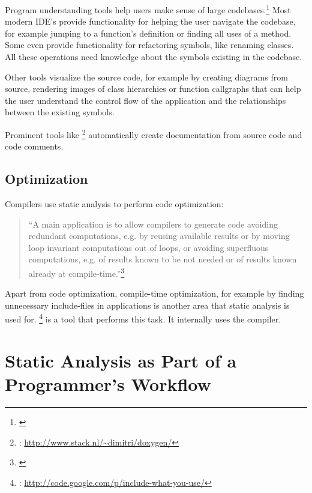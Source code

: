Program understanding tools help users make sense of large codebases.\footnote{\citep[27]{SecureProgramming}} Most modern IDE's provide functionality for helping the user navigate the codebase, for example jumping to a function's definition or finding all uses of a method. Some even provide functionality for refactoring symbols, like renaming classes. All these operations need knowledge about the symbols existing in the codebase.

Other tools visualize the source code, for example by creating  diagrams from source, rendering images of class hierarchies or function callgraphs that can help the user understand the control flow of the application and the relationships between the existing symbols.

Prominent tools like \footnote{: \url{http://www.stack.nl/~dimitri/doxygen/}} automatically create documentation from source code and code comments.

\subsection{Optimization}

Compilers use static analysis to perform code optimization:

\begin{quotation}
``A main application is to allow compilers to generate code avoiding redundant computations, e.g. by reusing available results or by moving loop invariant computations out of loops, or avoiding superfluous computations, e.g. of results known to be not needed or of results known already at compile-time.''\footnote{\citep[1]{ProgramAnalysis}}
\end{quotation}

Apart from code optimization, compile-time optimization, for example by finding \linebreak unnecessary include-files in  applications is another area that static analysis is used for. \footnote{: \url{http://code.google.com/p/include-what-you-use/}} is a tool that performs this task. It internally uses the  compiler.

\section{Static Analysis as Part of a Programmer's Workflow}

